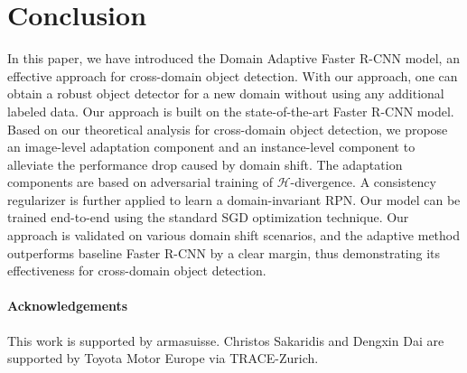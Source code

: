 \documentclass[10pt,twocolumn,letterpaper]{article}
\def\cH{\mathcal{H}}
\begin{document}
\section{Conclusion}
\label{sec:conclude}
In this paper, we have introduced the Domain Adaptive Faster R-CNN model, an effective approach for cross-domain object detection. With our approach, one can obtain a robust object detector for a new domain without using any additional labeled data. Our approach is built on the state-of-the-art Faster R-CNN model. Based on our theoretical analysis for cross-domain object detection, we propose an image-level adaptation component and an instance-level component to alleviate the performance drop caused by domain shift. The adaptation components are based on adversarial training of $\cH$-divergence. A consistency regularizer is further applied to learn a domain-invariant RPN. Our model can be trained end-to-end using the standard SGD optimization technique.  Our approach is validated on various domain shift scenarios, and the adaptive method outperforms baseline Faster R-CNN by a clear margin, thus demonstrating its effectiveness for cross-domain object detection. 

\vspace{-2mm}

\paragraph{Acknowledgements} 
This work is supported by armasuisse. Christos Sakaridis and Dengxin Dai are supported by Toyota Motor Europe via TRACE-Zurich.

{\small


}
\end{document}
